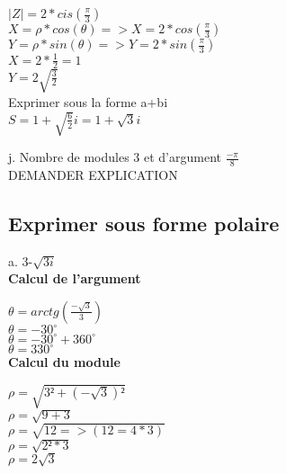 $|Z| = 2*cis(\frac{\pi}{3})$ \\

$X= \rho * cos(\theta) => X = 2*cos(\frac{\pi}{3})$  \\
$Y = \rho * sin(\theta) => Y = 2*sin(\frac{\pi}{3})$ \\

$X = 2*\frac{1}{2} = 1$ \\
$Y = 2\sqrt{\frac{3}{2}}$ \\

Exprimer sous la forme a+bi \\

$S = 1 + \sqrt{\frac{6}{2}} i = 1 + \sqrt{3} i$ \\

\newpage

j. Nombre de modules 3 et d'argument $\frac{-\pi}{8}$ \\

DEMANDER EXPLICATION


\newpage
\vspace{3mm} %
\subsection{Exprimer sous forme polaire}
\vspace{3mm} %

a. 3-$\sqrt{3i}$ \\

\textbf{Calcul de l'argument} \\
\vspace{3mm} %

$\theta = arctg(\frac{-\sqrt{3}} {3})$ \\
$\theta = -30^{\circ}$ \\
$\theta = -30^{\circ} + 360^{\circ}$ \\
$\theta = 330^{\circ}$ \\

\textbf{Calcul du module} \\
\vspace{3mm} %

$\rho = \sqrt{3²+(-\sqrt{3})²}$ \\
$\rho = \sqrt{9+3}$ \\
$\rho = \sqrt{12 => (12=4*3)}$ \\
$\rho = \sqrt{2²*3}$ \\
$\rho = 2\sqrt{3}$ \\

